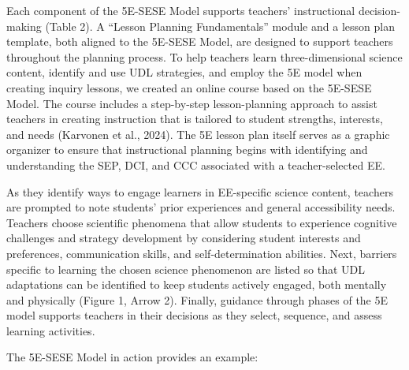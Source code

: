 \documentclass[11.5pt]{sig-alternate} %
\begin{document}
\begin{large}
Each component of the 5E-SESE Model supports teachers’ instructional decision-making (Table 2). A “Lesson Planning Fundamentals” module and a lesson plan template, both aligned to the 5E-SESE Model, are designed to support teachers throughout the planning process. To help teachers learn three-dimensional science content, identify and use UDL strategies, and employ the 5E model when creating inquiry lessons, we created an online course based on the 5E-SESE Model. The course includes a step-by-step lesson-planning approach to assist teachers in creating instruction that is tailored to student strengths, interests, and needs (Karvonen et al., 2024). The 5E lesson plan itself serves as a graphic organizer to ensure that instructional planning begins with identifying and understanding the SEP, DCI, and CCC associated with a teacher-selected EE.


As they identify ways to engage learners in EE-specific science content, teachers are prompted to note students’ prior experiences and general accessibility needs. Teachers choose scientific phenomena that allow students to experience cognitive challenges and strategy development by considering student interests and preferences, communication skills, and self-determination abilities. Next, barriers specific to learning the chosen science phenomenon are listed so that UDL adaptations can be identified to keep students actively engaged, both mentally and physically (Figure 1, Arrow 2). Finally, guidance through phases of the 5E model supports teachers in their decisions as they select, sequence, and assess learning activities.

The 5E-SESE Model in action provides an example: 


\end{large}
\end{document}
